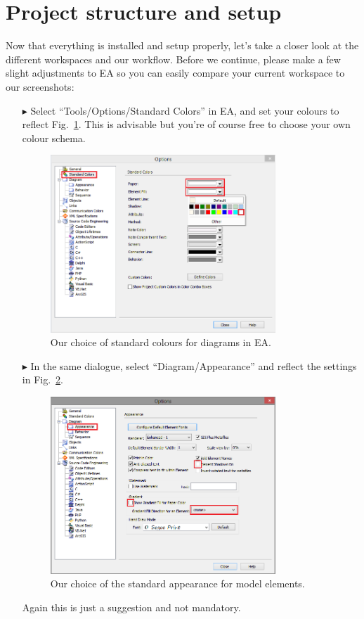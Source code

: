 \section{Project structure and setup}
Now that everything is installed and setup properly, let's take a closer look at the different workspaces and our workflow.
Before we continue, please make a few slight adjustments to EA so you can easily compare your current workspace to our screenshots:
\begin{itemize} 

\item[$\blacktriangleright$] Select ``Tools/Options/Standard Colors'' in EA, and set your colours to reflect Fig.~\ref{fig_standardColoursEA}.
This is advisable but you're of course free to choose your own colour schema.
\begin{figure}[htbp]
  \centering
  \includegraphics[width=0.8\textwidth]{pics/installationAndSetup/standardColours}
  \caption{Our choice of standard colours for diagrams in EA.}
  \label{fig_standardColoursEA}
\end{figure}

\item[$\blacktriangleright$] In the same dialogue, select ``Diagram/Appearance'' and reflect the settings in Fig.~\ref{fig_standardAppearanceEA}.
\begin{figure}[htbp]
  \centering
  \includegraphics[width=0.8\textwidth]{pics/installationAndSetup/standardAppearance}
  \caption{Our choice of the standard appearance for model elements.}
  \label{fig_standardAppearanceEA}
\end{figure}
Again this is just a suggestion and not mandatory.


\end{itemize}
